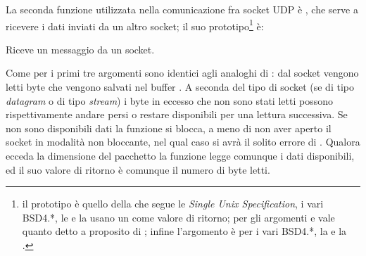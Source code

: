 La seconda funzione utilizzata nella comunicazione fra socket UDP è
, che serve a ricevere i dati inviati da un altro socket; il
suo prototipo\footnote{il prototipo è quello della  che segue le
  \textit{Single Unix Specification}, i vari BSD4.*, le  e la
   usano un  come valore di ritorno; per gli argomenti
   e  vale quanto detto a proposito di ;
  infine l'argomento  è  per i vari BSD4.*, la
   e la .} è:
\begin{functions}
  
  
  Riceve un messaggio da un socket.
  
\end{functions}

Come per  i primi tre argomenti sono identici agli analoghi di
: dal socket vengono letti  byte che vengono salvati nel
buffer . A seconda del tipo di socket (se di tipo \textit{datagram}
o di tipo \textit{stream}) i byte in eccesso che non sono stati letti possono
rispettivamente andare persi o restare disponibili per una lettura successiva.
Se non sono disponibili dati la funzione si blocca, a meno di non aver aperto
il socket in modalità non bloccante, nel qual caso si avrà il solito errore di
.  Qualora  ecceda la dimensione del pacchetto la
funzione legge comunque i dati disponibili, ed il suo valore di ritorno è
comunque il numero di byte letti.

